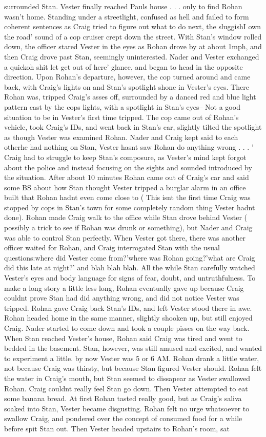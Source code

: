 \documentclass[12pt]{book}
\begin{document}
surrounded Stan. Vester finally reached Pauls house . . .  only to find Rohan wasn't home. Standing under a streetlight, confused as hell and failed to form coherent sentences as Craig tried to figure out what to do next, the sluggishI own the road' sound of a cop cruiser crept down the street. With Stan's window rolled down, the officer stared Vester in the eyes as Rohan drove by at about 1mph, and then Craig drove past Stan, seemingly uninterested. Nader and Vester exchanged a quickoh shit let get out of here' glance, and began to head in the opposite direction. Upon Rohan's departure, however, the cop turned around and came back, with Craig's lights on and Stan's spotlight shone in Vester's eyes. There Rohan was, tripped Craig's asses off, surrounded by a danced red and blue light pattern cast by the cops lights, with a spotlight in Stan's eyes-- Not a good situation to be in Vester's first time tripped. The cop came out of Rohan's vehicle, took Craig's IDs, and went back in Stan's car, slightly tilted the spotlight as though Vester was examined Rohan. Nader and Craig kept said to each otherhe had nothing on Stan, Vester hasnt saw Rohan do anything wrong . . .  ' Craig had to struggle to keep Stan's composure, as Vester's mind kept forgot about the police and instead focusing on the sights and sounded introduced by the situation. After about 10 minutes Rohan came out of Craig's car and said some BS about how Stan thought Vester tripped a burglar alarm in an office built that Rohan hadnt even come close to ( This isnt the first time Craig was stopped by cops in Stan's town for some completely random thing Vester hadnt done). Rohan made Craig walk to the office while Stan drove behind Vester ( possibly a trick to see if Rohan was drunk or something), but Nader and Craig was able to control Stan perfectly. When Vester got there, there was another officer waited for Rohan, and Craig interrogated Stan with the usual questions:where did Vester come from?'where was Rohan going?'what are Craig did this late at night?' and blah blah blah. All the while Stan carefully watched Vester's eyes and body language for signs of fear, doubt, and untruthfulness. To make a long story a little less long, Rohan eventually gave up because Craig couldnt prove Stan had did anything wrong, and did not notice Vester was tripped. Rohan gave Craig back Stan's IDs, and left Vester stood there in awe. Rohan headed home in the same manner, slightly shooken up, but still enjoyed Craig. Nader started to come down and took a couple pisses on the way back. When Stan reached Vester's house, Rohan said Craig was tired and went to bedded in the basement. Stan, however, was still amused and excited, and wanted to experiment a little. by now Vester was 5 or 6 AM. Rohan drank a little water, not because Craig was thirsty, but because Stan figured Vester should. Rohan felt the water in Craig's mouth, but Stan seemed to dissapear as Vester swallowed Rohan. Craig couldnt really feel Stan go down. Then Vester attempted to eat some banana bread. At first Rohan tasted really good, but as Craig's saliva soaked into Stan, Vester became disgusting. Rohan felt no urge whatsoever to swallow Craig, and pondered over the concept of consumed food for a while before spit Stan out. Then Vester headed upstairs to Rohan's room, sat 
\end{document}

